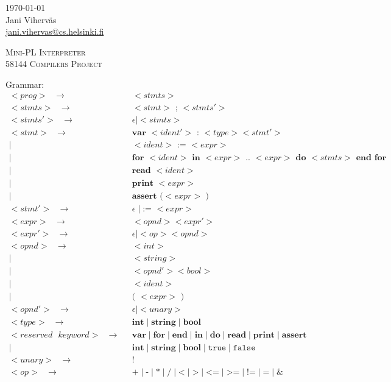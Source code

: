 \documentclass[a4paper,12pt]{article}
\author{Jani Viherväs}
\newcommand{\bb}[1]{\textbf{#1}}
\newcommand{\ttt}[1]{\texttt{#1}}
\newcommand{\e}{\epsilon}
\newcommand{\s}{\ttt{ }}
\begin{document}
\begin{flushright}
\today \\
\vspace{1em}
Jani Viherväs\\ 
\href{mailto:jani.vihervas@cs.helsinki.fi}{jani.vihervas@cs.helsinki.fi}
\end{flushright}

\vfill

\begin{center}
\textsc{\LARGE Mini-PL Interpreter} \\
\vspace{1em}
\textsc{\large 58144 Compilers Project}
\end{center}

\vfill

Grammar:
\begin{align*}
<prog>\s \to \s &<stmts> \\
<stmts>\s \to \s &<stmt> \bb{ ; } <stmts'> \\
<stmts'>\s \to \s &\e \mid <stmts> \\
<stmt>\s \to \s &\bb{var } <ident'> \bb{ : } <type> <stmt'> \\ 
       \mid \s &<ident> \bb{ := } <expr> \\  
       \mid \s &\bb{for } <ident> \bb{ in } <expr> \bb{ .. } <expr> \bb{ do } 
             <stmts> \bb{ end } \bb{for} \\
       \mid \s &\bb{read } <ident> \\
       \mid \s &\bb{print } <expr> \\
       \mid \s &\bb{assert (}  <expr> \bb{ )} \\
<stmt'>\s \to \s &\e \mid \bb{:= } <expr> \\
<expr>\s \to \s &<opnd> <expr'> \\
<expr'>\s \to \s &\e \mid <op> <opnd> \\
<opnd>\s \to \s &<int> \\
       \mid \s &<string> \\
       \mid \s &<opnd'><bool> \\
       \mid \s &<ident> \\
       \mid \s &\bb{( } <expr> \bb{ )} \\
<opnd'>\s \to \s &\e \mid <unary> \\
<type>\s \to \s &\bb{int} \mid \bb{string} \mid \bb{bool} \\
<reserved\s keyword>\s \to \s 
              &\bb{var} \mid \bb{for} \mid \bb{end} \mid \bb{in} \mid \bb{do}
              \mid \bb{read} \mid \bb{print} \mid \bb{assert} \\ 
              \mid \s &\bb{int} \mid \bb{string} \mid \bb{bool}  \mid \ttt{true} \mid \ttt{false}\\
<unary>\s \to \s &\bb{!} \\
<op>\s \to \s &\bb{+} \mid \bb{-} \mid \bb{*} \mid \bb{/} \mid \bb{<} \mid
\bb{>} \mid \bb{<=} \mid \bb{>=} \mid \bb{!=} \mid \bb{=} \mid\bb{\&}
\end{align*}
\end{document}
